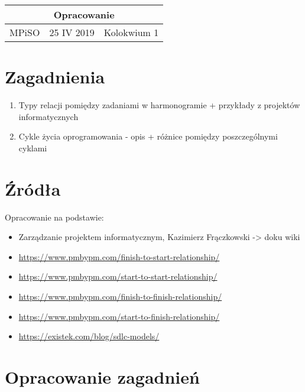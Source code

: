 \documentclass[a4paper,15pt]{article}
\begin{document}
\begin{table}
\begin{center}
\begin{tabular}{|c|c|c|}
\hline
\multicolumn{3}{|c|}{\textbf{Opracowanie}} \\ \hline MPiSO & 25 IV 2019 & Kolokwium 1 \\ \hline

\end{tabular}
\end{center}
\end{table}

\tableofcontents

\newpage
\section{Zagadnienia}
\begin{enumerate}

\item Typy relacji pomiędzy zadaniami w harmonogramie + przykłady z projektów informatycznych

\item Cykle życia oprogramowania - opis + różnice pomiędzy poszczególnymi cyklami

\end{enumerate}


\section{Źródła}
Opracowanie na podstawie:
\begin{itemize}
\item Zarządzanie projektem informatycznym, Kazimierz Frączkowski  -> doku wiki
\item \url{https://www.pmbypm.com/finish-to-start-relationship/}
\item \url{https://www.pmbypm.com/start-to-start-relationship/}
\item \url{https://www.pmbypm.com/finish-to-finish-relationship/}
\item \url{https://www.pmbypm.com/start-to-finish-relationship/}
\item \url{https://existek.com/blog/sdlc-models/}
\end{itemize}


\newpage
\section{Opracowanie zagadnień}
\end{document}

